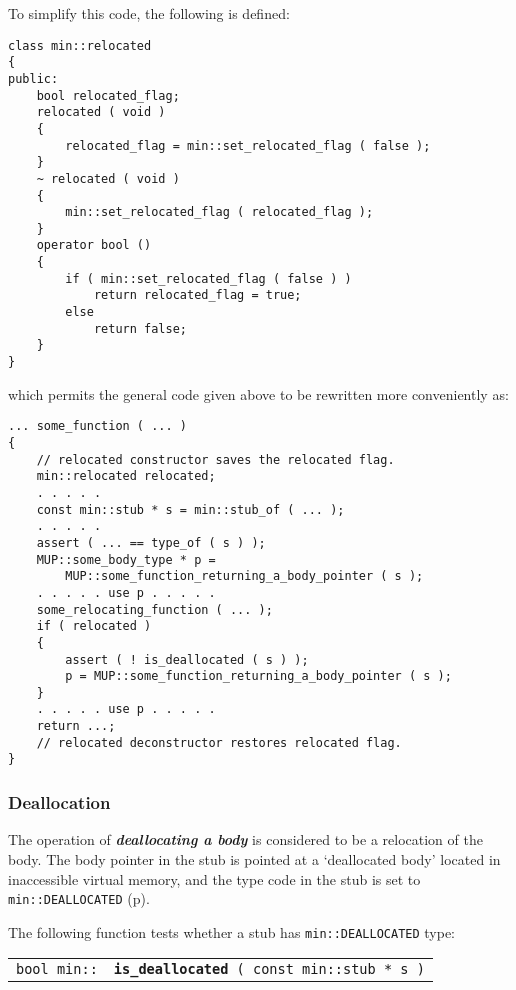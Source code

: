 \documentclass[12pt]{article}
\makeatletter
\newcommand{\ikey}[2]{{\bf \em #1}\index{#2}}
\newcommand{\ttindex}[1]{\index{#1@{\tt #1}}}
\newcommand{\minindex}[1]{\ttindex{min::#1}\ttindex{#1}}
\newcommand{\pagref}[1]{p\pageref{#1}}
\newenvironment{indpar}[1][0.3in]%
	{\begin{list}{}%
		     {\setlength{\itemsep}{0in}%
		      \setlength{\topsep}{0in}%
		      \setlength{\parsep}{1ex}%
		      \setlength{\labelwidth}{#1}%
		      \setlength{\leftmargin}{#1}%
		      \addtolength{\leftmargin}{\labelsep}}%
	 \item}%
	{\end{list}}
\newcommand{\LABEL}[1]{\label{#1}}
\newcommand{\MINKEY}[1]{{\tt \bf #1}\minindex{#1}}
\makeatother
\begin{document}
To simplify this code, the following is defined:

\begin{indpar}\begin{verbatim}
class min::relocated
{
public:
    bool relocated_flag;
    relocated ( void )
    {
        relocated_flag = min::set_relocated_flag ( false );
    }
    ~ relocated ( void )
    {
        min::set_relocated_flag ( relocated_flag );
    }
    operator bool ()
    {
        if ( min::set_relocated_flag ( false ) )
            return relocated_flag = true;
        else
            return false;
    }
}
\end{verbatim}\end{indpar}\LABEL{MIN::RELOCATED}

which permits the general code given above to be rewritten more conveniently
as:

\begin{indpar}\begin{verbatim}
... some_function ( ... )
{
    // relocated constructor saves the relocated flag.
    min::relocated relocated;
    . . . . .
    const min::stub * s = min::stub_of ( ... );
    . . . . .
    assert ( ... == type_of ( s ) );
    MUP::some_body_type * p =
        MUP::some_function_returning_a_body_pointer ( s );
    . . . . . use p . . . . .
    some_relocating_function ( ... );
    if ( relocated )
    {
        assert ( ! is_deallocated ( s ) );
        p = MUP::some_function_returning_a_body_pointer ( s );
    }
    . . . . . use p . . . . .
    return ...;
    // relocated deconstructor restores relocated flag.
}
\end{verbatim}\end{indpar}

\subsubsection{Deallocation}
\label{DEALLOCATION}

The operation of \ikey{deallocating a body}{deallocate!body}
is considered to be a relocation of the body.  The body pointer in the
stub is pointed at a `deallocated body' located in
inaccessible virtual memory, and the type code in the stub
is set to {\tt min::DEALLOCATED} (\pagref{MIN::DEALLOCATED}).

The following function tests whether a stub
has {\tt min::DEALLOCATED} type:

\begin{indpar}\begin{tabular}{r@{}l}
\verb|bool min::| & \MINKEY{is\_deallocated}\verb| ( const min::stub * s )|
\LABEL{MIN::IS_DEALLOCATED}
\end{tabular}\end{indpar}
\end{document}
